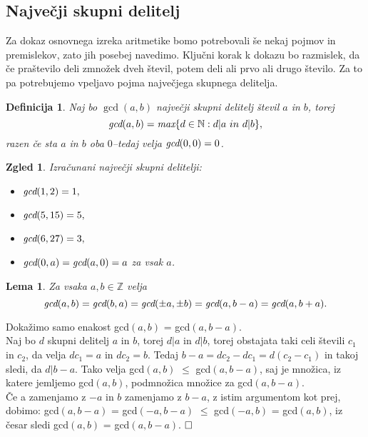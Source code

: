 \documentclass[a4paper,12pt]{article}
\def\qed{$\hfill\Box$}   %
\newtheorem{lema}{Lema}
\newtheorem{definicija}{Definicija}
\newtheorem{zgled}{Zgled}
\begin{document}
\subsection{Največji skupni delitelj}
Za dokaz osnovnega izreka aritmetike bomo potrebovali še nekaj pojmov in
premislekov, zato jih posebej navedimo. Ključni korak k dokazu bo razmislek,
da če praštevilo deli zmnožek dveh števil, potem deli ali prvo ali drugo število.
Za to pa potrebujemo vpeljavo pojma največjega skupnega delitelja.

\begin{definicija}
	Naj bo $\gcd(a,b)$ največji skupni delitelj števil $a$ in $b$, torej
	$$\emph{gcd}(a,b) = \emph{max}\{d \in \mathbb{N} : d|a \ in \ d|b\},$$
razen če sta $a$ in $b$ oba $0$--tedaj velja $\emph{gcd}(0,0)=0$.
\end{definicija}

\begin{zgled}
	Izračunani največji skupni delitelji:
	\begin{itemize}
		\item $\emph{gcd}(1,2)=1,$
		\item $\emph{gcd}(5,15)=5,$
		\item $\emph{gcd}(6,27)=3,$
		\item $\emph{gcd}(0,a)=\emph{gcd}(a,0)=a$ za vsak $a$.
	\end{itemize}
\end{zgled}

\begin{lema}
	Za vsaka $a,b \in \mathbb{Z}$ velja
	$$ \emph{gcd}(a,b) = \emph{gcd}(b,a) = \emph{gcd}(\pm a, \pm b) = \emph{gcd}(a, b - a) = \emph{gcd}(a, b + a).$$
\end{lema}

	Dokažimo samo enakost gcd$(a, b)$ = gcd$(a, b-a)$.
	\\
	Naj bo $d$ skupni delitelj $a$ in $b$, torej $d|a$ in $d|b$, torej obstajata taki celi števili
	$c_1$ in $c_2$, da velja $dc_1 = a$ in $dc_2 = b$. Tedaj $b-a = dc_2-dc_1 = d(c_2-c_1)$ in
	takoj sledi, da $d|b-a$. Tako velja gcd$(a, b)$ $\le$ gcd$(a, b-a)$, saj je množica, iz
	katere jemljemo gcd$(a, b)$, podmnožica množice za gcd$(a, b-a)$.
	\\
	Če a zamenjamo z $-a$ in $b$ zamenjamo z $b-a$, z istim argumentom kot prej,
	dobimo: gcd$(a, b-a)$ = gcd$(-a, b-a)$ $\le$ gcd$(-a, b)$ = gcd$(a, b)$, iz česar sledi
	gcd$(a, b)$ = gcd$(a, b-a)$.
\qed
\end{document}
